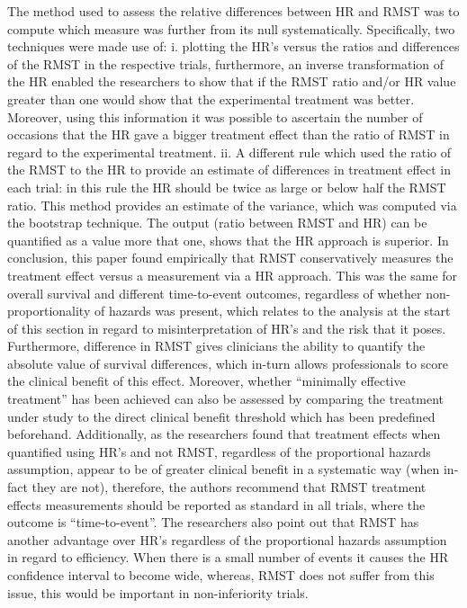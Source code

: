 \documentclass[12pt,twoside]{reedthesis}
\begin{document}
The method used to assess the relative differences between HR and RMST was to compute which measure was further from its null systematically. Specifically, two techniques were made use of: i. plotting the HR's versus the ratios and differences of the RMST in the respective trials, furthermore, an inverse transformation of the HR enabled the researchers to show that if the RMST ratio and/or HR value greater than one would show that the experimental treatment was better. Moreover, using this information it was possible to ascertain the number of occasions that the HR gave a bigger treatment effect than the ratio of RMST in regard to the experimental treatment. ii. A different rule which used the ratio of the RMST to the HR to provide an estimate of differences in treatment effect in each trial: in this rule the HR should be twice as large or below half the RMST ratio. This method provides an estimate of the variance, which was computed via the bootstrap technique. The output (ratio between RMST and HR) can be quantified as a value more that one, shows that the HR approach is superior.
In conclusion, this paper found empirically that RMST conservatively measures the treatment effect versus a measurement via a HR approach. This was the same for overall survival and different time-to-event outcomes, regardless of whether non-proportionality of hazards was present, which relates to the analysis at the start of this section in regard to misinterpretation of HR's and the risk that it poses. Furthermore, difference in RMST gives clinicians the ability to quantify the absolute value of survival differences, which in-turn allows professionals to score the clinical benefit of this effect. Moreover, whether ``minimally effective treatment'' has been achieved can also be assessed by comparing the treatment under study to the direct clinical benefit threshold which has been predefined beforehand. Additionally, as the researchers found that treatment effects when quantified using HR's and not RMST, regardless of the proportional hazards assumption, appear to be of greater clinical benefit in a systematic way (when in-fact they are not), therefore, the authors recommend that RMST treatment effects measurements should be reported as standard in all trials, where the outcome is ``time-to-event''.
The researchers also point out that RMST has another advantage over HR's regardless of the proportional hazards assumption in regard to efficiency. When there is a small number of events it causes the HR confidence interval to become wide, whereas, RMST does not suffer from this issue, this would be important in non-inferiority trials.
\end{document}
